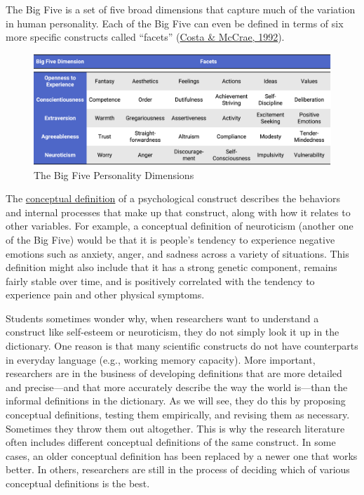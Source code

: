 \documentclass[
]{krantz}
\begin{document}
The Big Five is a set of five broad dimensions that capture much of the variation in human personality. Each of the Big Five can even be defined in terms of six more specific constructs called ``facets'' (\protect\hyperlink{ref-costa1992normal}{Costa \& McCrae, 1992}).

\begin{figure}

{\centering \includegraphics[width=1\linewidth]{images/measurement/big5} 

}

\caption{The Big Five Personality Dimensions}\label{fig:big5}
\end{figure}

The \protect\hyperlink{conceptual-definition}{conceptual definition} of a psychological construct describes the behaviors and internal processes that make up that construct, along with how it relates to other variables. For example, a conceptual definition of neuroticism (another one of the Big Five) would be that it is people's tendency to experience negative emotions such as anxiety, anger, and sadness across a variety of situations. This definition might also include that it has a strong genetic component, remains fairly stable over time, and is positively correlated with the tendency to experience pain and other physical symptoms.

Students sometimes wonder why, when researchers want to understand a construct like self-esteem or neuroticism, they do not simply look it up in the dictionary. One reason is that many scientific constructs do not have counterparts in everyday language (e.g., working memory capacity). More important, researchers are in the business of developing definitions that are more detailed and precise---and that more accurately describe the way the world is---than the informal definitions in the dictionary. As we will see, they do this by proposing conceptual definitions, testing them empirically, and revising them as necessary. Sometimes they throw them out altogether. This is why the research literature often includes different conceptual definitions of the same construct. In some cases, an older conceptual definition has been replaced by a newer one that works better. In others, researchers are still in the process of deciding which of various conceptual definitions is the best.
\end{document}
